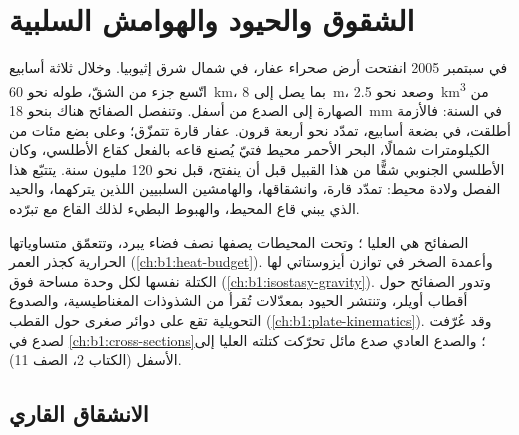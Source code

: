 \chapter{الشقوق والحيود والهوامش السلبية}\label{ch:b1:rifts-ridges-margins}

في سبتمبر 2005 انفتحت أرض صحراء عفار، في شمال شرق إثيوبيا. وخلال ثلاثة أسابيع اتّسع جزء من الشقّ، طوله نحو \qty{60}{km}، بما يصل إلى \qty{8}{m}، وصعد نحو \qty{2.5}{km^3} من الصهارة إلى الصدع من أسفل. وتنفصل الصفائح هناك بنحو \qty{18}{mm} في السنة: فالأزمة أطلقت، في بضعة أسابيع، تمدّد نحو أربعة قرون. عفار قارة تتمزّق؛ وعلى بضع مئات من الكيلومترات شمالًا، البحر الأحمر محيط فتيّ يُصنع قاعه بالفعل كقاع الأطلسي، وكان الأطلسي الجنوبي شقًّا من هذا القبيل قبل أن ينفتح، قبل نحو 120 مليون سنة. يتتبّع هذا الفصل ولادة محيط: تمدّد قارة، وانشقاقها، والهامشين السلبيين اللذين يتركهما، والحيد الذي يبني قاع المحيط، والهبوط البطيء لذلك القاع مع تبرّده.

\begin{recall}
الصفائح هي  العليا ؛ وتحت المحيطات يصفها نصف فضاء يبرد، وتتعمّق متساوياتها الحرارية كجذر العمر (\cref{ch:b1:heat-budget}). وأعمدة الصخر في توازن أيزوستاتي لها الكتلة نفسها لكل وحدة مساحة فوق  (\cref{ch:b1:isostasy-gravity}). وتدور الصفائح حول أقطاب أويلر، وتنتشر الحيود بمعدّلات تُقرأ من الشذوذات المغناطيسية، والصدوع التحويلية تقع على دوائر صغرى حول القطب (\cref{ch:b1:plate-kinematics}). وقد عُرّفت   لصدع في \cref{ch:b1:cross-sections}؛ والصدع العادي صدع مائل تحرّكت كتلته العليا إلى الأسفل (الكتاب 2، الصف 11).
\end{recall}

\section{الانشقاق القاري}

